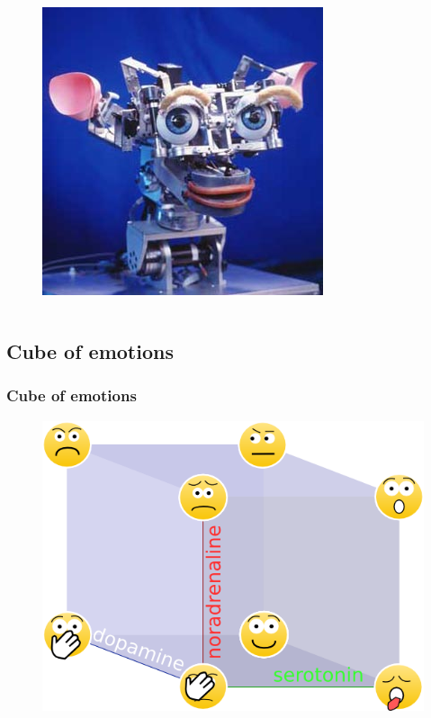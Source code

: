 \documentclass[12pt, aspectratio=169]{beamer}
\begin{document}
\begin{frame}
\begin{columns}[c]
\begin{figure}
\includegraphics[width=1.0\linewidth]{Kismet_312}
\end{figure}
\end{columns}
\end{frame}

\subsection{Cube of emotions}

\begin{frame}
\frametitle{Cube of emotions}
\begin{figure}
\includegraphics[width=0.6\linewidth]{cube_of_emotional_parameters}
\end{figure}
\end{frame}
\end{document}
